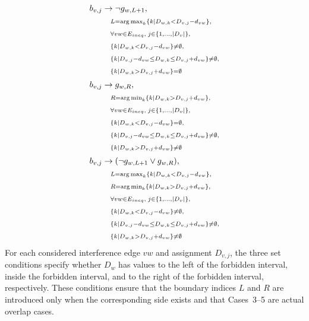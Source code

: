 \documentclass[letterpaper,journal]{IEEEtran}
\begin{document}
\begin{align}
    b_{v,j} &\rightarrow \neg g_{w,L+1},
    \notag\\
    &\quad
    {\scriptstyle
    L=\operatorname{arg\,max}_{k}
    \{k\mid D_{w,k}<D_{v,j}-d_{vw}\},}
    \notag\\
    &\quad
    {\scriptstyle
    \forall vw\in E_{ineq},\; j\in\{1,\ldots,|D_v|\},}
    \notag\\
    &\quad
    {\scriptstyle
    \{k\mid D_{w,k}<D_{v,j}-d_{vw}\}\neq\emptyset,}
    \notag\\
    &\quad
    {\scriptstyle
    \{k\mid D_{v,j}-d_{vw}\le D_{w,k}\le D_{v,j}+d_{vw}\}\neq\emptyset,}
    \notag\\
    &\quad
    {\scriptstyle
    \{k\mid D_{w,k}>D_{v,j}+d_{vw}\}=\emptyset}
    \label{eq:forbid_2}\\[2pt]
    b_{v,j} &\rightarrow g_{w,R},
    \notag\\
    &\quad
    {\scriptstyle
    R=\operatorname{arg\,min}_{k}
    \{k\mid D_{w,k}>D_{v,j}+d_{vw}\},}
    \notag\\
    &\quad
    {\scriptstyle
    \forall vw\in E_{ineq},\; j\in\{1,\ldots,|D_v|\},}
    \notag\\
    &\quad
    {\scriptstyle
    \{k\mid D_{w,k}<D_{v,j}-d_{vw}\}=\emptyset,}
    \notag\\
    &\quad
    {\scriptstyle
    \{k\mid D_{v,j}-d_{vw}\le D_{w,k}\le D_{v,j}+d_{vw}\}\neq\emptyset,}
    \notag\\
    &\quad
    {\scriptstyle
    \{k\mid D_{w,k}>D_{v,j}+d_{vw}\}\neq\emptyset}
    \label{eq:forbid_1}\\[2pt]
    b_{v,j} &\rightarrow (\neg g_{w,L+1}\lor g_{w,R}),
    \notag\\
    &\quad
    {\scriptstyle
    L=\operatorname{arg\,max}_{k}
    \{k\mid D_{w,k}<D_{v,j}-d_{vw}\},}
    \notag\\
    &\quad
    {\scriptstyle
    R=\operatorname{arg\,min}_{k}
    \{k\mid D_{w,k}>D_{v,j}+d_{vw}\},}
    \notag\\
    &\quad
    {\scriptstyle
    \forall vw\in E_{ineq},\; j\in\{1,\ldots,|D_v|\},}
    \notag\\
    &\quad
    {\scriptstyle
    \{k\mid D_{w,k}<D_{v,j}-d_{vw}\}\neq\emptyset,}
    \notag\\
    &\quad
    {\scriptstyle
    \{k\mid D_{v,j}-d_{vw}\le D_{w,k}\le D_{v,j}+d_{vw}\}\neq\emptyset,}
    \notag\\
    &\quad
    {\scriptstyle
    \{k\mid D_{w,k}>D_{v,j}+d_{vw}\}\neq\emptyset}
    \label{eq:forbid_3}
\end{align}
For each considered interference edge \(vw\) and assignment \(D_{v,j}\), the three set conditions specify whether \(D_w\) has values to the left of the forbidden interval, inside the forbidden interval, and to the right of the forbidden interval, respectively. These conditions ensure that the boundary indices \(L\) and \(R\) are introduced only when the corresponding side exists and that Cases~3--5 are actual overlap cases.
\end{document}
